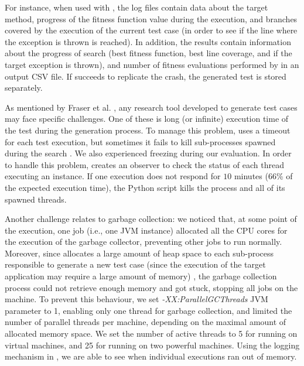 For instance, when used with \evocrash, the log files contain data about the target method, progress of the fitness function value during the execution, and branches covered by the execution of the current test case (in order to see if the line where the exception is thrown is reached). 
In addition, the results contain information about the progress of search (best fitness function, best line coverage, and if the target exception is thrown), and number of fitness evaluations performed by \evocrash in an output CSV file. 
If \evocrash succeeds to replicate the crash, the generated test is stored separately.

As mentioned by Fraser et al. \cite{FA13challenges}, any research tool developed to generate test cases may face specific challenges. 
One of these is long (or infinite) execution time of the test during the generation process. 
To manage this problem, \evosuite uses a timeout for each test execution, but sometimes it fails to kill sub-processes spawned during the search \cite{FA13challenges}.
We also experienced \evocrash freezing during our evaluation. 
%
In order to handle this problem, \exrunner creates an observer to check the status of each thread executing an \evocrash instance.
If one \evocrash execution does not respond for $10$ minutes (66\% of the expected execution time), the Python script kills the \evocrash process and all of its spawned threads. 

Another challenge relates to garbage collection: we noticed that, at some point of the execution, one job (i.e., one JVM instance) allocated all the CPU cores for the execution of the garbage collector, preventing other jobs to run normally. 
Moreover, since \evocrash allocates a large amount of heap space to each sub-process responsible to generate a new test case (since the execution of the target application may require a large amount of memory) \cite{FA13challenges}, the garbage collection process could not retrieve enough memory and got stuck, stopping all jobs on the machine.
To prevent this behaviour, we set \emph{-XX:ParallelGCThreads} JVM parameter to 1, enabling only one thread for garbage collection, and limited the number of parallel threads per machine, depending on the maximal amount of allocated memory space. 
We set the number of active threads to 5 for running on virtual machines, and 25 for running on two powerful machines. 
Using the logging mechanism in \evocrash, we are able to see when individual executions ran out of memory.

